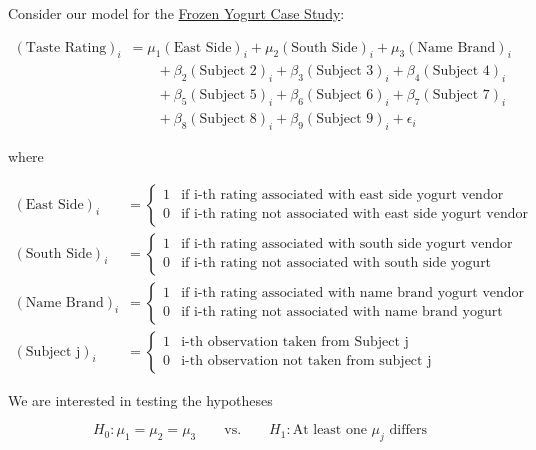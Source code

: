 \documentclass[]{book}
\theoremstyle{plain}
\theoremstyle{mydefn}
\theoremstyle{myexmpl}
\theoremstyle{remark}
\begin{document}
Consider our model for the \protect\hyperlink{CaseYogurt}{Frozen Yogurt
Case Study}:

\[
\begin{aligned}
  (\text{Taste Rating})_i &= \mu_1 (\text{East Side})_i + \mu_2 (\text{South Side})_i + \mu_3 (\text{Name Brand})_i \\
    &\qquad + \beta_2 (\text{Subject 2})_i + \beta_3 (\text{Subject 3})_i + \beta_4 (\text{Subject 4})_i \\
    &\qquad + \beta_5 (\text{Subject 5})_i + \beta_6 (\text{Subject 6})_i + \beta_7 (\text{Subject 7})_i \\
    &\qquad + \beta_8 (\text{Subject 8})_i + \beta_9 (\text{Subject 9})_i + \epsilon_i
\end{aligned}
\]

where

\[
\begin{aligned}
  (\text{East Side})_i &= \begin{cases}
    1 & \text{if i-th rating associated with east side yogurt vendor} \\
    0 & \text{if i-th rating not associated with east side yogurt vendor}
    \end{cases} \\
  (\text{South Side})_i &= \begin{cases}
    1 & \text{if i-th rating associated with south side yogurt vendor} \\
    0 & \text{if i-th rating not associated with south side yogurt vendor}
    \end{cases} \\
  (\text{Name Brand})_i &= \begin{cases}
    1 & \text{if i-th rating associated with name brand yogurt vendor} \\
    0 & \text{if i-th rating not associated with name brand yogurt vendor}
    \end{cases} \\
  (\text{Subject j})_i &= \begin{cases}
  1 & \text{i-th observation taken from Subject j} \\
  0 & \text{i-th observation not taken from subject j}
  \end{cases}
\end{aligned}
\]

We are interested in testing the hypotheses

\[H_0: \mu_1 = \mu_2 = \mu_3 \qquad \text{vs.} \qquad H_1: \text{At least one } \mu_j \text{ differs}\]
\end{document}
